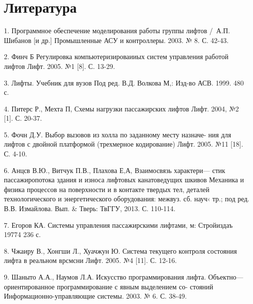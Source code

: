
\usepackage{hyperref,xcolor}

\usepackage{tocloft}
\renewcommand{\thesection}{}
\renewcommand{\thesubsection}{\arabic{mysection}.\arabic{subsection}}

\providecommand\mytitle{HП.430200.090404.000.ПЗ}
\providecommand\doctitle{Производственная - научно-исследовательская работа в семестре}



\setcounter{page}{2}
\tableofcontents

\newpage




\newpage
\section{Литература}
1. Программное обеспечение моделирования работы группы лифтов
/\ А.П. Шибанов [и др.] \/\/ Промышленные АСУ и контроллеры. 2003. № 8.
С. 42-43.

2. Финч Б Регулировка компьютеризироваииых систем управления
работой лифтов \/\/ Лифт. 2005. №1 [8]. С. 13-29.

3. Лифты. Учебник для вузов \/ Под ред. В.Д. Волкова М,: Изд-во
АСВ. 1999. 480 с.

4. Питерс Р., Мехта П, Схемы нагрузки пассажирских лифтов \/\/
Лифт. 2004, №2 [1]. С. 20-37.

5. Фочн Д.У. Выбор вызовов из холла по заданному месту назначе-
ния для лифтов с двойной платформой (трехмерное кодирование) \/\/ Лифт.
2005. №11 [18]. С. 4-10.

6. Анцсв В.Ю., Витчук П.В., Плахова Е‚А‚ Взаимосвязь характери—
стик пассажиропотока здания и износа лифтовых канатоведущих шкивов \/\/
Механика и физика процессов на поверхности и в контакте твердых тел,
деталей технологического и энергетического оборудования: межвуз. сб.
науч‹ тр.; под ред. В.В. Измайлова. Вып. \& Тверь: ТвГГУ, 2013. С. 110-114.

7. Егоров КА. Системы управления пассажирскими лифтами, м:
Стройиздаъ 19774 236 с.

8. Чжаиру В., Хонгши Л., Хуачжун Ю. Система текущего контроля
состояния лифта в реальном врсмсни \/\/ Лифт. 2005. №4 [11]. С. 12-16.

9. Шаныто А.А., Наумов Л.А. Искусство программирования лифта.
Объектно—ориентированное программирование с явным выделением со-
стояний \/\/ Информационно-управляющие системы. 2003. № 6. С. 38-49.


